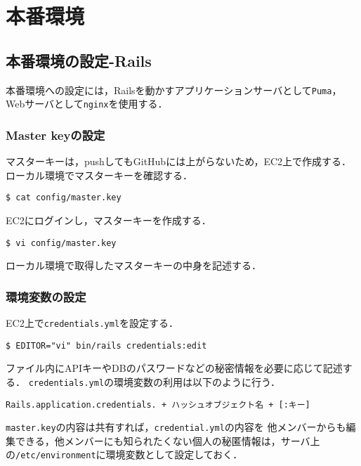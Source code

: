 \chapter{本番環境}
\section{本番環境の設定-Rails}
本番環境への設定には，Railsを動かすアプリケーションサーバとして\texttt{Puma}，
Webサーバとして\texttt{nginx}を使用する．
\subsection{Master keyの設定}
{{マスター}}キーは，pushしてもGitHubには上がらないため，EC2上で作成する．
ローカル環境で{{マスター}}キーを確認する．
\begin{screen}
    \texttt{\$ cat config/master.key}
\end{screen}
EC2にログインし，{{マスター}}キーを作成する．
\begin{screen}
    \texttt{\$ vi config/master.key}
\end{screen}
ローカル環境で取得した{{マスター}}キーの中身を記述する．

\subsection{環境変数の設定}
EC2上で\texttt{credentials.yml}を設定する．
\begin{screen}
    \texttt{\$ EDITOR="vi" bin/rails credentials:edit}
\end{screen}
ファイル内にAPIキーやDBのパスワードなどの秘密情報を必要に応じて記述する．
\texttt{credentials.yml}の環境変数の利用は以下のように行う．
\begin{screen}
    \texttt{Rails.application.credentials. + ハッシュオブジェクト名 + [:キー]}
\end{screen}
\texttt{master.key}の内容は共有すれば，\texttt{credential.yml}の内容を
他メンバーからも編集できる，他メンバーにも知られたくない個人の秘匿情報は，サーバ上
の\texttt{/etc/environment}に環境変数として設定しておく．

